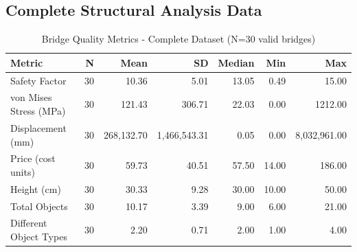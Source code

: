 \subsection{Complete Structural Analysis Data}
\begin{table}[H]
\centering
\caption{Bridge Quality Metrics - Complete Dataset (N=30 valid bridges)}
\label{tab:bridge_quality_complete}
\begin{tabular}{lrrrrrr}
\toprule
\textbf{Metric} & \textbf{N} & \textbf{Mean} & \textbf{SD} & \textbf{Median} & \textbf{Min} & \textbf{Max} \\
\midrule
Safety Factor & 30 & 10.36 & 5.01 & 13.05 & 0.49 & 15.00 \\
von Mises Stress (MPa) & 30 & 121.43 & 306.71 & 22.03 & 0.00 & 1212.00 \\
Displacement (mm) & 30 & 268,132.70 & 1,466,543.31 & 0.05 & 0.00 & 8,032,961.00 \\
Price (cost units) & 30 & 59.73 & 40.51 & 57.50 & 14.00 & 186.00 \\
Height (cm) & 30 & 30.33 & 9.28 & 30.00 & 10.00 & 50.00 \\
Total Objects & 30 & 10.17 & 3.39 & 9.00 & 6.00 & 21.00 \\
Different Object Types & 30 & 2.20 & 0.71 & 2.00 & 1.00 & 4.00 \\
\bottomrule
\end{tabular}
\end{table}

